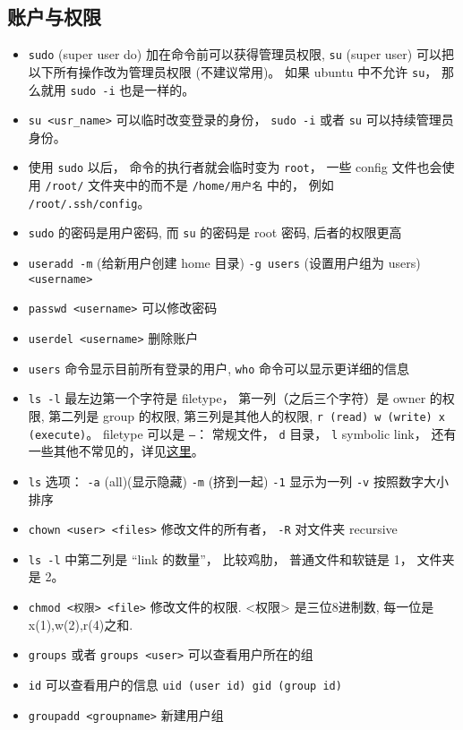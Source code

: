 \subsection{账户与权限}
\begin{itemize}
\item \verb`sudo` (super user do) 加在命令前可以获得管理员权限, \verb`su` (super user) 可以把以下所有操作改为管理员权限 (不建议常用)。 如果 ubuntu 中不允许 \verb|su|， 那么就用 \verb|sudo -i| 也是一样的。
\item \verb`su <usr_name>` 可以临时改变登录的身份， \verb|sudo -i| 或者 \verb|su| 可以持续管理员身份。
\item 使用 \verb|sudo| 以后， 命令的执行者就会临时变为 \verb|root|， 一些 config 文件也会使用 \verb|/root/| 文件夹中的而不是 \verb|/home/用户名| 中的， 例如 \verb|/root/.ssh/config|。
\item \verb`sudo` 的密码是用户密码, 而 \verb`su` 的密码是 root 密码, 后者的权限更高
\item \verb`useradd -m` (给新用户创建 home 目录) \verb`-g users` (设置用户组为 users) \verb`<username>`
\item \verb`passwd <username>` 可以修改密码
\item \verb`userdel <username>` 删除账户
\item \verb`users` 命令显示目前所有登录的用户, \verb`who` 命令可以显示更详细的信息
\item \verb`ls -l` 最左边第一个字符是 filetype， 第一列（之后三个字符）是 owner 的权限, 第二列是 group 的权限, 第三列是其他人的权限, \verb`r (read) w (write) x (execute)`。 filetype 可以是 \verb|–|： 常规文件， \verb|d| 目录， \verb|l| symbolic link， 还有一些其他不常见的，详见\href{https://linuxconfig.org/identifying-file-types-in-linux}{这里}。
\item \verb`ls` 选项： \verb`-a` (all)(显示隐藏) \verb`-m` (挤到一起) \verb`-1` 显示为一列 \verb`-v` 按照数字大小排序
\item \verb`chown <user> <files>` 修改文件的所有者， \verb|-R| 对文件夹 recursive
\item \verb|ls -l| 中第二列是 “link 的数量”， 比较鸡肋， 普通文件和软链是 1， 文件夹是 2。
\item \verb`chmod <权限> <file>` 修改文件的权限. <权限> 是三位8进制数, 每一位是 x(1),w(2),r(4)之和.
\item \verb`groups` 或者 \verb`groups <user>` 可以查看用户所在的组
\item \verb`id` 可以查看用户的信息 \verb`uid (user id) gid (group id)`
\item \verb`groupadd <groupname>` 新建用户组

\end{itemize}
